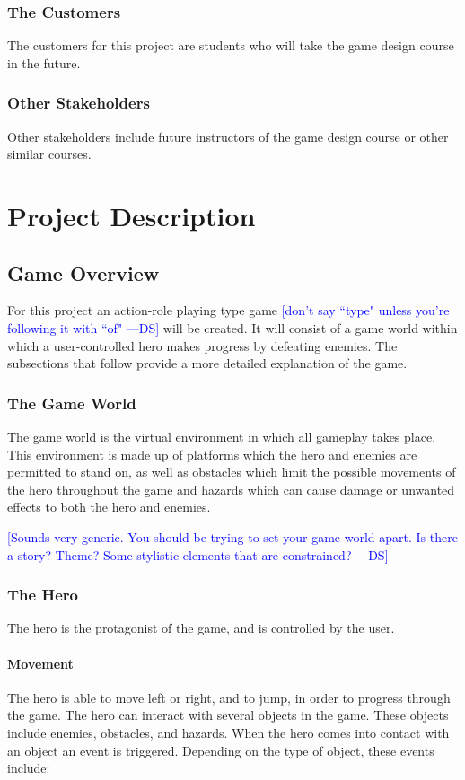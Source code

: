 \documentclass[12pt, titlepage]{article}
\newcommand{\authornote}[3]{\textcolor{#1}{[#3 ---#2]}}
\newcommand{\authornote}[3]{}
\newcommand{\ds}[1]{\authornote{blue}{DS}{#1}}
\begin{document}
\subsubsection{The Customers}
The customers for this project are students who will take the game design course in the future.
\subsubsection{Other Stakeholders}
Other stakeholders include future instructors of the game design course or other similar courses.

\newpage
\section{Project Description}
\subsection{Game Overview}
For this project an action-role playing type game
\ds{don't say ``type" unless you're following it with ``of"}
will be created.  It will consist of a game world within which a user-controlled hero makes progress by defeating enemies.  The subsections that follow provide a more detailed explanation of the game.

\subsubsection{The Game World}
The game world is the virtual environment in which all gameplay takes place.  This environment is made up of platforms which the hero and enemies are permitted to stand on, as well as obstacles which limit the possible movements of the hero throughout the game and hazards which can cause damage or unwanted effects to both the hero and enemies.

\ds{Sounds very generic. You should be trying to set your game world apart.
Is there a story? Theme? Some stylistic elements that are constrained?}

\subsubsection{The Hero}
The hero is the protagonist of the game, and is controlled by the user.

\paragraph{Movement}
The hero is able to move left or right, and to jump, in order to progress through the game.  The hero can interact with several objects in the game.  These objects include enemies, obstacles, and hazards.  When the hero comes into contact with an object an event is triggered.  Depending on the type of object, these events include:
\end{document}

